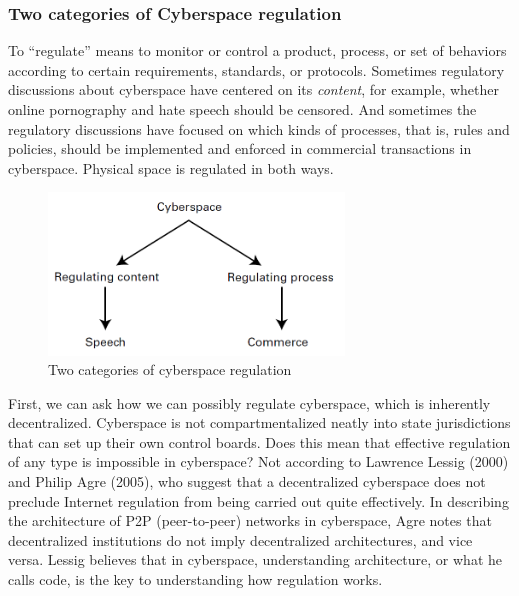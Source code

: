 \documentclass[12pt]{article}
\theoremstyle{definition}
\begin{document}
\subsubsection{Two categories of Cyberspace regulation}
To “regulate” means to monitor or control a product, process, or set of behaviors
according to certain requirements, standards, or protocols. Sometimes regulatory discussions
about cyberspace have centered on its \textit{content}, for example, whether online
pornography and hate speech should be censored. And sometimes the regulatory
discussions have focused on which kinds of processes, that is, rules and policies, should be implemented and enforced in commercial transactions in cyberspace. Physical space is
regulated in both ways.\\
\begin{figure}[h]
\centering
\includegraphics[width=0.7\textwidth]{11.png}
\caption{Two categories of cyberspace regulation}
\end{figure}
First, we can ask how we can possibly regulate cyberspace, which is inherently
decentralized. Cyberspace is not compartmentalized neatly into state jurisdictions that
can set up their own control boards. Does this mean that effective regulation of any type
is impossible in cyberspace? Not according to Lawrence Lessig (2000) and Philip Agre (2005), who suggest that a decentralized cyberspace does not preclude Internet
regulation from being carried out quite effectively. In describing the architecture of
P2P (peer-to-peer) networks in cyberspace, Agre notes that decentralized institutions
do not imply decentralized architectures, and vice versa. Lessig believes that in cyberspace,
understanding architecture, or what he calls code, is the key to understanding how
regulation works.
\end{document}
